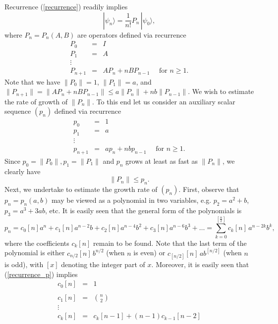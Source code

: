 \documentclass[11 pt]{article}
\begin{document}
Recurrence (\ref{recurrence}) readily implies
\begin{equation}\label{psi_from_P}
|\psi_n\rangle = \frac{1}{n !}P_n\, |\psi_0\rangle, 
\end{equation}
where $P_n = P_n(A,B)$ are operators defined via recurrence
\begin{equation}\label{recurrence_P}
\begin{array}{lll}
P_0 &= &I \\
P_1  &=& A \\
\vdots & &\\
P_{n+1} & = & AP_n + nBP_{n-1}\quad \mbox{ for } n\geq 1.
\end{array}
\end{equation}
Note that we have $\|P_0\| =1$, $\|P_1\| = a$, and $\|P_{n+1}\| = \| AP_n + nBP_{n-1}\| \leq a \|P_n\| +n b \|P_{n-1}\|$. We wish to estimate the rate of growth of $\|P_n\|$. To this end let us consider an auxiliary scalar sequence $(p_n)$ defined via recurrence
\begin{equation}\label{recurrence_p}
\begin{array}{lll}
p_0 &= &1 \\
p_1  &=& a \\
\vdots & &\\
p_{n+1} & = & ap_n + nbp_{n-1}\quad \mbox{ for } n\geq 1.
\end{array}
\end{equation}
Since $p_0 = \|P_0\|, p_1 =\|P_1\|$ and $p_n$ grows at least as fast as $\|P_n\|$, we clearly have 
\begin{equation}\label{stage}
\|P_n\| \leq p_n.
\end{equation}
 Next, we undertake to estimate the growth rate of $(p_n)$. First, observe that $p_n = p_n(a,b)$ may be viewed as a polynomial in two variables, e.g. $p_2 = a^2 +b$, $p_3 = a^3 + 3ab$, etc. It is easily seen that the general form of the polynomials is
 \begin{equation}\label{gen_p}
 p_n = c_0[n]a^n + c_1[n] a^{n-2}b + c_2[n] a^{n-4}b^2 +  c_3[n] a^{n-6}b^3 + \ldots  = \sum\limits_{k=0}^{[\frac{n}{2}]}c_k[n]\, a^{n-2k}b^k,
 \end{equation}
 where the coefficients $c_k[n]$ remain to be found. Note that the last term of the polynomial is either $c_{n/2}[n]\, b^{n/2}$ (when $n$ is even) or $c_{[n/2]}[n]\, a b^{[n/2]}$ (when $n$ is odd), with $[x]$ denoting the integer part of $x$.
Moreover, it is easily seen that (\ref{recurrence_p}) implies 
\begin{equation}\label{recurrence_p}
\begin{array}{lll}
c_0[n] &= &1  \\
&& \\
c_1[n]  &=& {n\choose{2}} \\
\vdots & &\\
c_k[n]& = & c_k[n-1] + (n-1) c_{k-1}[n-2]
\end{array}
\end{equation}
\end{document}
